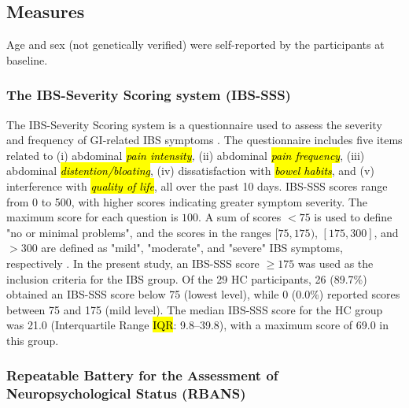\documentclass[diagnostics,article,accept,pdftex,moreauthors]{Definitions/mdpi}
\begin{document}
\subsection{Measures}
 Age and sex (not genetically verified) were self-reported by the participants at baseline. 

\subsubsection{The IBS-Severity Scoring system (IBS-SSS)} 



 The IBS-Severity Scoring system is a questionnaire used to assess the severity and frequency of GI-related IBS symptoms \cite{francis1997irritable}. The questionnaire includes five items related to (i) abdominal \textit{\hl{pain intensity}, %
} (ii) abdominal \textit{\hl{pain frequency}}, (iii) abdominal \textit{\hl{distention/bloating}}, (iv) dissatisfaction with \textit{\hl{bowel habits}}, and (v) interference with \textit{\hl{quality of life}}, all over the past 10 days. IBS-SSS scores range from 0 to 500, with higher scores indicating greater symptom severity. The maximum score for each question is $100$. A sum of scores  $< 75$ is used to define "no or minimal problems", and the scores in the ranges $[75, 175)$, $[175, 300]$, and $>$300 are defined as "mild", "moderate", and "severe" IBS symptoms, respectively \cite{francis1997irritable}. In the present study, an IBS-SSS score $\geq 175$ was used as the inclusion criteria for the IBS group. 
{ Of the 29 HC participants, 26 (89.7\%) obtained an IBS-SSS score below 75 (lowest level), while 0 (0.0\%) reported scores between 75 and 175 (mild level). The median IBS-SSS score for the HC group was 21.0 (Interquartile Range \hl{IQR}: %
9.8--39.8), with a maximum score of 69.0 in this group.}




\subsubsection{Repeatable Battery for the Assessment of Neuropsychological Status (RBANS)}
\end{document}
